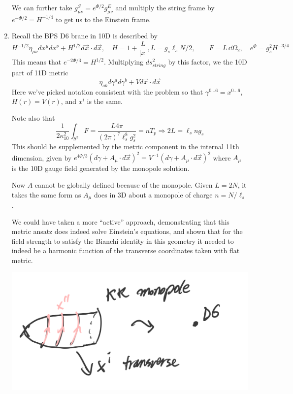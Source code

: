 \documentclass[11pt, class=article, crop=false]{standalone}
\begin{document}
\begin{enumerate}
	We can further take $g^S_{\mu \nu} = e^{\Phi/2} g^E_{\mu \nu}$ and multiply the string frame by $e^{-\Phi/2} = H^{-1/4}$ to get us to the Einstein frame. 
	
	\item Recall the BPS D6 brane in 10D is described by 
	\[
		H^{-1/2} \eta_{\mu \nu} dx^\mu dx^\nu + H^{1/2} d\vec x \cdot d \vec x , \quad H = 1 + \frac{L}{|x|}, L = g_s \ell_s N /2, \qquad F = L \, \dd \Omega_2, \quad e^{\Phi} = g_s^2 H^{-3/4}
	\]
	This means that $e^{-2\Phi/3} = H^{1/2}$. Multiplying $ds^2_{string}$ by this factor, we the 10D part of 11D metric
	\[
		\eta_{ab} d\gamma^a d \gamma^b + V d\vec x \cdot d \vec x
	\]
	Here we've picked notation consistent with the problem so that $\gamma^{0 \dots 6} = x^{0 \dots 6}$, $H(r) = V(r)$, and $x^i$ is the same.
	
	Note also that
	\[
		\frac{1}{2 \kappa_{10}^2} \int_{S^2} F = \frac{L 4 \pi}{(2\pi)^7 \ell_s^8 g_s^2} = n T_p \Rightarrow 2 L = \ell_s n g_s
	\]
	This should be supplemented by the metric component in the internal 11th dimension, given by $e^{4 \Phi/3} (d\gamma + A_\mu \cdot d \vec x)^2 = V^{-1} (d\gamma + A_\mu \cdot d \vec x)^2$ where $A_\mu$ is the 10D gauge field generated by the monopole solution. 
	
	Now $A$ cannot be globally defined because of the monopole. Given $L = 2N$, it takes the same form as $A_\mu$ does in 3D about a monopole of charge $n = N/\ell_s$.
	
	We could have taken a more ``active'' approach, demonstrating that this metric ansatz does indeed solve Einstein's equations, and shown that for the field strength to satisfy the Bianchi identity in this geometry it needed to indeed be a harmonic function of the transverse coordinates taken with flat metric. 
	
	\begin{center}
		\includegraphics[scale=0.2]{"Drawings/Cigar"}
	\end{center}
	

\end{enumerate}
\end{document}

